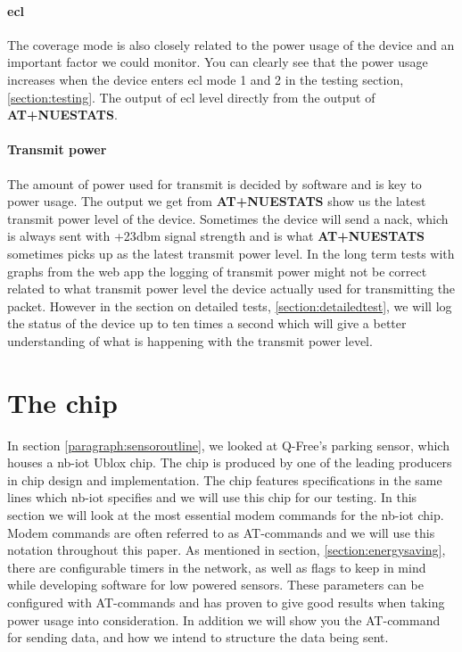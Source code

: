 \documentclass[USenglish]{ifimaster}  %
\begin{document}
\paragraph{\acrshort{ecl}}
The coverage mode is also closely related to the power usage of the device and an important factor we could monitor. You can clearly see that the power usage increases when the device enters \acrshort{ecl} mode 1 and 2 in the testing section, \vref{section:testing}. The output of \acrshort{ecl} level directly from the output of \textbf{AT+NUESTATS}.

\paragraph{Transmit power}
The amount of power used for transmit is decided by software and is key to power usage. The output we get from \textbf{AT+NUESTATS} show us the latest transmit power level of the device. Sometimes the device will send a \acrfull{nack}, which is always sent with +23\acrshort{dbm} signal strength and is what \textbf{AT+NUESTATS} sometimes picks up as the latest transmit power level. In the long term tests with graphs from the web app the logging of transmit power might not be correct related to what transmit power level the device actually used for transmitting the packet. However in the section on detailed tests, \vref{section:detailedtest}, we will log the status of the device up to ten times a second which will give a better understanding of what is happening with the transmit power level.


\section{The chip}
In section \vref{paragraph:sensoroutline}, we looked at Q-Free's parking sensor, which houses a \acrshort{nb-iot} Ublox chip. The chip is produced by one of the leading producers in chip design and implementation. The chip features specifications in the same lines which \acrshort{nb-iot} specifies and we will use this chip for our testing. In this section we will look at the most essential modem commands for the \acrshort{nb-iot} chip. Modem commands are often referred to as AT-commands and we will use this notation throughout this paper. As mentioned in section, \vref{section:energysaving}, there are configurable timers in the network, as well as flags to keep in mind while developing software for low powered sensors. These parameters can be configured with AT-commands and has proven to give good results when taking power usage into consideration. In addition we will show you the AT-command for sending data, and how we intend to structure the data being sent.
\end{document}

